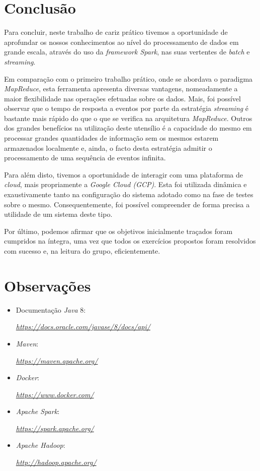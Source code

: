 \documentclass[a4paper]{report}
\begin{document}
\chapter{Conclusão} \label{ch:Conclusion}
\large{
    Para concluir, neste trabalho de cariz prático tivemos a oportunidade de aprofundar os nossos conhecimentos ao nível do processamento de dados em grande escala, através do uso da \textit{framework Spark}, nas suas vertentes de \textit{batch} e \textit{streaming}.

    Em comparação com o primeiro trabalho prático, onde se abordava o paradigma \textit{MapReduce}, esta ferramenta apresenta diversas vantagens, nomeadamente a maior flexibilidade nas operações efetuadas sobre os dados.
    Mais, foi possível observar que o tempo de resposta a eventos por parte da estratégia \textit{streaming} é bastante mais rápido do que o que se verifica na arquitetura \textit{MapReduce}.
    Outros dos grandes benefícios na utilização deste utensílio é a capacidade do mesmo em processar grandes quantidades de informação sem os mesmos estarem armazenados localmente e, ainda, o facto desta estratégia admitir o processamento de uma sequência de eventos infinita. 

    Para além disto, tivemos a oportunidade de interagir com uma plataforma de \textit{cloud}, mais propriamente a \textit{Google Cloud (GCP)}. Esta foi utilizada dinâmica e exaustivamente tanto na configuração do sistema adotado como na fase de testes sobre o mesmo.
    Consequentemente, foi possível compreender de forma precisa a utilidade de um sistema deste tipo.

    Por último, podemos afirmar que os objetivos inicialmente traçados foram cumpridos na íntegra, uma vez que todos os exercícios propostos foram resolvidos com sucesso e, na leitura do grupo, eficientemente.
}

\appendix
\chapter{Observações} \label{ch:Observations}
\begin{itemize}
    \item Documentação \textit{Java} 8:
    \par \textit{\url{https://docs.oracle.com/javase/8/docs/api/}}
    \item \textit{Maven}:
    \par \textit{\url{https://maven.apache.org/}}
    \item \textit{Docker}:
    \par \textit{\url{https://www.docker.com/}}
    \item \textit{Apache Spark}:
    \par \textit{\url{https://spark.apache.org/}}
    \item \textit{Apache Hadoop}:
    \par \textit{\url{http://hadoop.apache.org/}}
\end{itemize}
\end{document}

